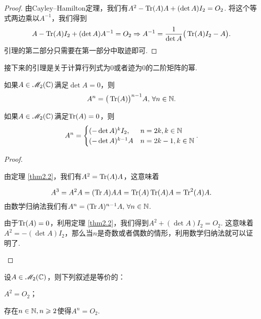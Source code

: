 \begin{proof}
  由Cayley--Hamilton定理，我们有$A^2-\operatorname{Tr}(A)A+(\det A)I_2=O_2$. 将这个等式两边乘以$A^{-1}$，我们得到
  \[
    A - \operatorname{Tr}(A)I_2 + (\det A)A^{-1} = O_2 \Rightarrow A^{-1} = \frac1{\det A}\big(
    \operatorname{Tr}(A)I_2 - A\big).
  \]
  引理的第二部分只需要在第一部分中取迹即可.
\end{proof}

接下来的引理是关于计算行列式为0或者迹为0的二阶矩阵的幂.

\begin{lemma}[两类特殊矩阵的$n$次幂]
  \begin{enum}
    \item 如果$A\in\mathscr M_2(\mathbb C)$满足$\det A=0$，则
      \[
        A^n = \big( \operatorname{Tr}(A) \big)^{n-1}A,\,\forall n\in\mathbb N.
      \]
    \item 如果$A\in\mathscr M_2(\mathbb C)$满足$\operatorname{Tr}(A)=0$，则
      \[
        A^n = \begin{cases}
          (-\det A)^kI_2,  & n = 2k,k\in\mathbb N \\
          (-\det A)^{k-1}A & n = 2k-1, k\in\mathbb N
        \end{cases}.
      \]
  \end{enum}
\end{lemma}

\begin{proof}
  \begin{enuma}
    \item 由定理 \ref{thm2.2}，我们有$A^2=\operatorname{Tr}(A)A$，这意味着
  \end{enuma}
    \[
      A^3 = A^2A =(\operatorname{Tr} A)AA = \operatorname{Tr}(A)\operatorname{Tr}(A)A = \operatorname{Tr}^2(A)A.
    \]
  由数学归纳法我们有$A^n=(\operatorname{Tr} A)^{n-1}A,\,\forall n\in\mathbb N$.

  \begin{enuma}
    \setcounter{enumi}{1}
    \item 由于$\operatorname{Tr}(A)=0$，利用定理 \ref{thm2.2}，我们得到$A^2+(\det A)I_2=O_2$. 这意味着$A^2=-(\det A)I_2$，那么当$n$是奇数或者偶数的情形，利用数学归纳法就可以证明了.
  \end{enuma}
\end{proof}

\begin{lemma}
  设$A\in\mathscr M_2(\mathbb C)$，则下列叙述是等价的：
  \begin{enum}
    \item \label{lemma2.3.a} $A^2=O_2$；
    \item \label{lemma2.3.b} 存在$n\in\mathbb N,n\geqslant2$使得$A^n=O_2$.
  \end{enum}
\end{lemma}

